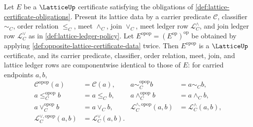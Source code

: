 \begin{theorem}
\label{thm:double-opposite-lattice-certificate-data-identity}
Let $E$ be a $\LatticeUp$ certificate satisfying the obligations of \autoref{def:lattice-certificate-obligations}. Present its lattice data by a carrier predicate $\mathcal C$, classifier $\sim_C$, order relation $\le_C$, meet $\wedge_C$, join $\vee_C$, meet ledger row $\mathcal L_C^{\wedge}$, and join ledger row $\mathcal L_C^{\vee}$ as in \autoref{def:lattice-ledger-policy}. Let $E^{\mathrm{opop}}=(E^{\mathrm{op}})^{\mathrm{op}}$ be obtained by applying \autoref{def:opposite-lattice-certificate-data} twice. Then $E^{\mathrm{opop}}$ is a $\LatticeUp$ certificate, and its carrier predicate, classifier, order relation, meet, join, and lattice ledger rows are componentwise identical to those of $E$: for carried endpoints $a,b$,
$$
\begin{aligned}
\mathcal C^{\mathrm{opop}}(a)&=\mathcal C(a),&
a\sim_C^{\mathrm{opop}}b&=a\sim_C b,\\
a\le_C^{\mathrm{opop}}b&=a\le_C b,&
a\wedge_C^{\mathrm{opop}}b&=a\wedge_C b,\\
a\vee_C^{\mathrm{opop}}b&=a\vee_C b,&
\mathcal L_C^{\wedge,\mathrm{opop}}(a,b)&=\mathcal L_C^{\wedge}(a,b),\\
\mathcal L_C^{\vee,\mathrm{opop}}(a,b)&=\mathcal L_C^{\vee}(a,b).
\end{aligned}
$$
\end{theorem}
